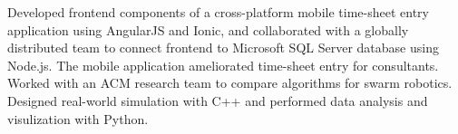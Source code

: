 \documentclass[
    10pt,
    A4,
    english,
    draft = false,
    twoside = false,
]{article}
\begin{document}
        {Developed frontend components of a cross-platform mobile time-sheet
        entry application using AngularJS and Ionic, and collaborated with a
        globally distributed team to connect frontend to Microsoft SQL Server
        database using Node.js. The mobile application ameliorated time-sheet
        entry for consultants.}
	{Worked with an ACM research team to compare algorithms for swarm
	robotics. Designed real-world simulation with C++ and performed data
	analysis and visulization with Python.}

	
	\newpage
	
\end{document}
